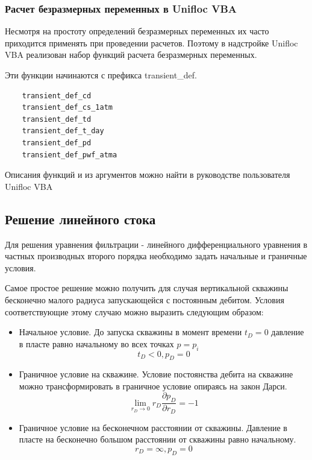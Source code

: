 \subsubsection{Расчет безразмерных переменных в Unifloc VBA}

Несмотря на простоту определений безразмерных переменных их часто приходится применять при проведении расчетов. Поэтому в надстройке Unifloc VBA реализован набор функций расчета безразмерных переменных.

Эти функции начинаются с префикса  transient\_def.

\begin{verbatim}
	transient_def_cd
	transient_def_cs_1atm
	transient_def_td
	transient_def_t_day
	transient_def_pd
	transient_def_pwf_atma
\end{verbatim}	

Описания функций и из аргументов можно найти в руководстве пользователя  Unifloc VBA

\subsection{Решение линейного стока}

Для решения уравнения фильтрации - линейного дифференциального уравнения в частных производных второго порядка необходимо задать начальные и граничные условия. 

Самое простое решение можно получить для случая вертикальной скважины бесконечно малого радиуса запускающейся с постоянным дебитом. Условия соответствующие этому случаю можно выразить следующим образом:

\begin{itemize}
	\item Начальное условие. До запуска скважины в момент времени  $t_D = 0$ давление в пласте равно начальному во всех точках $p=p_i$
	$$ t_D < 0, p_D = 0 $$ 
	\item Граничное условие на скважине.  Условие постоянства дебита на скважине можно трансформировать в граничное условие опираясь на закон Дарси.
	$$ \lim_{r_D \to 0} {r_D \frac{\partial p_D}{\partial r_D}} = -1$$
	\item Граничное условие на бесконечном расстоянии от скважины. Давление в пласте на бесконечно большом расстоянии от скважины равно начальному.
	$$ r_D = \infty, p_D = 0$$
\end{itemize}


